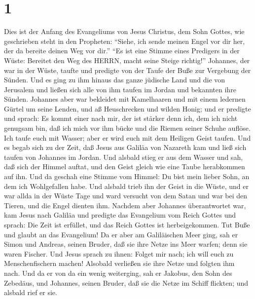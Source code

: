 \hypertarget{section}{%
\section{1}\label{section}}

 Dies ist der Anfang des Evangeliums von Jesus Christus, dem
Sohn Gottes,  wie geschrieben steht in den Propheten:
``Siehe, ich sende meinen Engel vor dir her, der da bereite deinen Weg
vor dir.''  ``Es ist eine Stimme eines Predigers in der
Wüste: Bereitet den Weg des HERRN, macht seine Steige richtig!''
 Johannes, der war in der Wüste, taufte und predigte von der
Taufe der Buße zur Vergebung der Sünden.  Und es ging zu ihm
hinaus das ganze jüdische Land und die von Jerusalem und ließen sich
alle von ihm taufen im Jordan und bekannten ihre Sünden. 
Johannes aber war bekleidet mit Kamelhaaren und mit einem ledernen
Gürtel um seine Lenden, und aß Heuschrecken und wilden Honig;
 und er predigte und sprach: Es kommt einer nach mir, der
ist stärker denn ich, dem ich nicht genugsam bin, daß ich mich vor ihm
bücke und die Riemen seiner Schuhe auflöse.  Ich taufe euch
mit Wasser; aber er wird euch mit dem Heiligen Geist taufen.
 Und es begab sich zu der Zeit, daß Jesus aus Galiläa von
Nazareth kam und ließ sich taufen von Johannes im Jordan. 
Und alsbald stieg er aus dem Wasser und sah, daß sich der Himmel auftat,
und den Geist gleich wie eine Taube herabkommen auf ihn. 
Und da geschah eine Stimme vom Himmel: Du bist mein lieber Sohn, an dem
ich Wohlgefallen habe.  Und alsbald trieb ihn der Geist in
die Wüste,  und er war allda in der Wüste Tage und ward
versucht von dem Satan und war bei den Tieren, und die Engel dienten
ihm.  Nachdem aber Johannes überantwortet war, kam Jesus
nach Galiläa und predigte das Evangelium vom Reich Gottes 
und sprach: Die Zeit ist erfüllet, und das Reich Gottes ist
herbeigekommen. Tut Buße und glaubt an das Evangelium!  Da
er aber am Galiläischen Meer ging, sah er Simon und Andreas, seinen
Bruder, daß sie ihre Netze ins Meer warfen; denn sie waren Fischer.
 Und Jesus sprach zu ihnen: Folget mir nach; ich will euch
zu Menschenfischern machen!  Alsobald verließen sie ihre
Netze und folgten ihm nach.  Und da er von da ein wenig
weiterging, sah er Jakobus, den Sohn des Zebedäus, und Johannes, seinen
Bruder, daß sie die Netze im Schiff flickten; und alsbald rief er sie.
